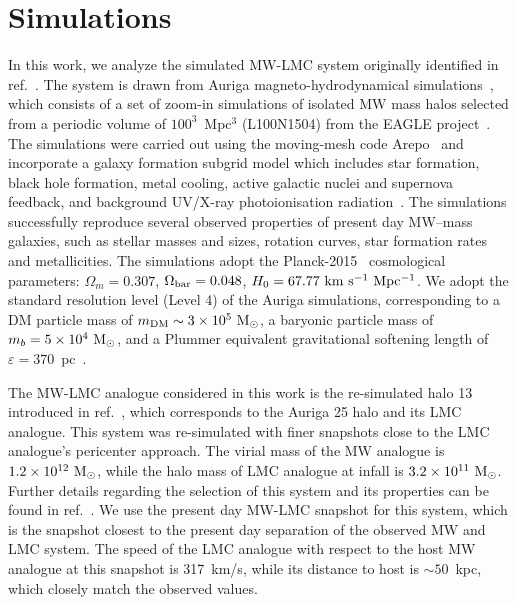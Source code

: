 \documentclass[a4paper,11pt]{article}
\newcommand{\Msun}{{\rm M}_\odot}
\renewcommand{\epsilon}{\varepsilon}
\begin{document}
\section{Simulations}
\label{sec:sims}

In this work, we analyze the simulated MW-LMC system originally identified  in ref.~\cite{Smith-Orlik:2023kyl}. The system is drawn from Auriga magneto-hydrodynamical simulations~\citep{Grand:2016mgo, Grand:2024}, which consists of a set of zoom-in simulations of isolated MW mass halos selected from a periodic volume of $100^3$~Mpc$^3$ (L100N1504) from the EAGLE project~\cite{Schaye:2014tpa, Crain:2015poa}. The simulations were carried out using the moving-mesh code Arepo~\citep{Springel:2009aa} and incorporate a galaxy formation subgrid model which includes star formation, black hole formation, metal cooling, active galactic nuclei and supernova feedback, and background UV/X-ray photoionisation radiation~\cite{Grand:2016mgo}. The  simulations successfully reproduce several observed properties of present day MW–mass galaxies, such as
stellar masses and sizes, rotation curves, star formation rates and metallicities. The simulations adopt the Planck-2015~\citep{Planck:2015fie} cosmological parameters: $\Omega_{m}=0.307$, $\Omega_{\rm bar}=0.048$, $H_0=67.77~{\rm km~s^{-1}~Mpc^{-1}}$. We adopt the standard resolution level (Level 4) of the Auriga simulations, corresponding to a DM particle mass of $m_{\rm DM} \sim 3\times 10^5~\Msun$, a baryonic particle mass of $m_b=5\times10^4~\Msun$, and a Plummer equivalent gravitational softening length of $\epsilon=370$~pc~\citep{Power:2002sw,Jenkins2013}.


The MW-LMC analogue considered in this work is the re-simulated halo 13 introduced in ref.~\cite{Smith-Orlik:2023kyl}, which corresponds to the Auriga 25 halo and its LMC analogue. This system was re-simulated with finer snapshots close to the LMC analogue's pericenter approach. The virial mass of the MW analogue is $1.2 \times 10^{12}~\Msun$, while the halo mass of LMC analogue at infall is $3.2 \times 10^{11}~\Msun$. Further details regarding the selection of this system and its properties can be found in ref.~\cite{Smith-Orlik:2023kyl}. We use the present day MW-LMC snapshot for this system, which is the snapshot closest to the present day separation of the observed MW and LMC system.  The speed of the LMC analogue with respect to the host MW analogue at this snapshot  is 317~km/s, while its distance to host is $\sim 50$~kpc, which closely match  the observed values. 
\end{document}

